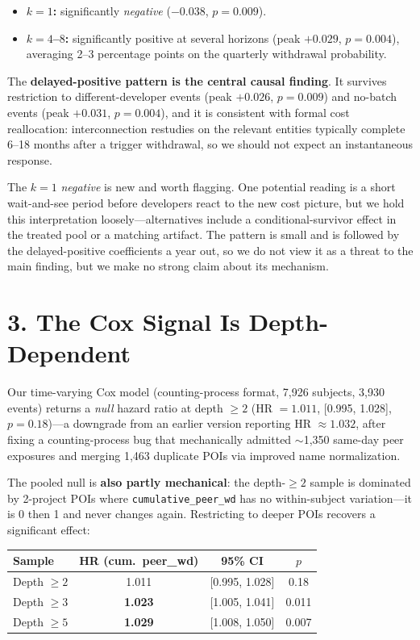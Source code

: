 \documentclass[10pt,letterpaper]{article}
\begin{document}
\begin{itemize}
\setlength\itemsep{1pt}
\item \textbf{$k = 1$:} significantly \emph{negative} ($-0.038$, $p = 0.009$).
\item \textbf{$k = 4$--$8$:} significantly positive at several horizons (peak $+0.029$, $p = 0.004$), averaging 2--3 percentage points on the quarterly withdrawal probability.
\end{itemize}

The \textbf{delayed-positive pattern is the central causal finding}. It survives restriction to different-developer events (peak $+0.026$, $p = 0.009$) and no-batch events (peak $+0.031$, $p = 0.004$), and it is consistent with formal cost reallocation: interconnection restudies on the relevant entities typically complete 6--18 months after a trigger withdrawal, so we should not expect an instantaneous response.

The $k = 1$ \emph{negative} is new and worth flagging. One potential reading is a short wait-and-see period before developers react to the new cost picture, but we hold this interpretation loosely---alternatives include a conditional-survivor effect in the treated pool or a matching artifact. The pattern is small and is followed by the delayed-positive coefficients a year out, so we do not view it as a threat to the main finding, but we make no strong claim about its mechanism.

\section*{3. The Cox Signal Is Depth-Dependent}

Our time-varying Cox model (counting-process format, 7{,}926 subjects, 3{,}930 events) returns a \emph{null} hazard ratio at depth $\geq 2$ (HR $= 1.011$, [0.995, 1.028], $p = 0.18$)---a downgrade from an earlier version reporting HR $\approx 1.032$, after fixing a counting-process bug that mechanically admitted $\sim$1{,}350 same-day peer exposures and merging 1{,}463 duplicate POIs via improved name normalization.

The pooled null is \textbf{also partly mechanical}: the depth-$\geq 2$ sample is dominated by 2-project POIs where \texttt{cumulative\_peer\_wd} has no within-subject variation---it is 0 then 1 and never changes again. Restricting to deeper POIs recovers a significant effect:

\begin{center}
\small
\begin{tabular}{lccc}
\toprule
Sample & HR (cum.\ peer\_wd) & 95\% CI & $p$ \\
\midrule
Depth $\geq 2$ & 1.011 & [0.995, 1.028] & 0.18 \\
Depth $\geq 3$ & \textbf{1.023} & [1.005, 1.041] & 0.011 \\
Depth $\geq 5$ & \textbf{1.029} & [1.008, 1.050] & 0.007 \\
\bottomrule
\end{tabular}
\end{center}
\end{document}
